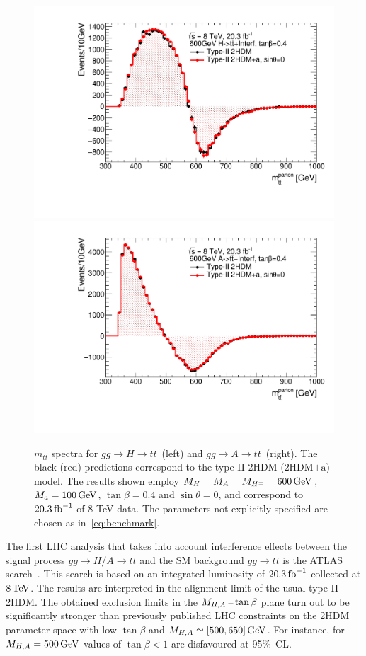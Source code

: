 \documentclass[a4paper, 11pt,notoc]{article}
\newcommand{\mA}{\ensuremath{M_{A}}\xspace}
\newcommand{\ma}{\ensuremath{M_{a}}\xspace}
\newcommand{\mH}{\ensuremath{M_{H}}\xspace}
\newcommand{\mHc}{\ensuremath{M_{H^{\pm}}}\xspace}
\newcommand{\hdma}{\ensuremath{\textrm{2HDM+a}}\xspace}
\begin{document}
\begin{figure}
\centering
\includegraphics[width=.475\textwidth]{ttres_2HDMvs2HDMa_H.pdf} \quad 
\includegraphics[width=.475\textwidth]{ttres_2HDMvs2HDMa_A.pdf}
\vspace{4mm}
\caption{$m_{t \bar t}$ spectra for $gg \to H \to t \bar t$~(left) and  $gg \to A \to t \bar t$~(right). The black (red) predictions correspond to the type-II 2HDM (\hdma) model.  The  results shown employ $\mH=\mA=\mHc = 600 \, {\rm GeV}$,  $\ma=100 \, {\rm GeV}$, $\tan \beta =0.4$ and $\sin \theta = 0$, and correspond to $20.3 \, {\rm fb}^{-1}$ of 8 TeV data.  The parameters not explicitly specified are chosen as in~\eqref{eq:benchmark}.}
\label{fig:ttres_2HDMvs2HDMa}
\end{figure}

The first LHC analysis that takes into account interference effects between the signal process $gg \to H/A \to t \bar t$ and the SM background $gg \to t \bar t$ is the ATLAS search~\cite{Aaboud:2017hnm}. This search  is based on an integrated luminosity of $20.3 \, {\rm fb}^{-1}$ collected at $8 \, {\rm TeV}$. The results are interpreted in the alignment limit of the usual type-II 2HDM. The obtained  exclusion limits in the $M_{H,A}\hspace{0.5mm}$--$\hspace{0.5mm} \tan \beta$ plane turn out to be significantly stronger than previously published LHC constraints on the 2HDM parameter space with low $\tan \beta$ and $M_{H,A} \simeq [500, 650] \, {\rm GeV}$. For instance,  for $M_{H,A} = 500 \, {\rm GeV}$ values of $\tan \beta < 1$ are disfavoured at 95\%~CL. %
\end{document}
